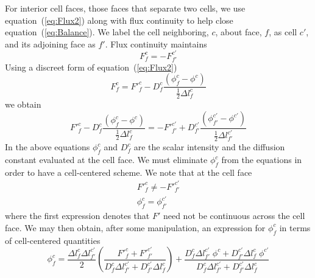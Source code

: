 \documentclass{article}
\begin{document}
For interior cell faces, those faces that separate two cells, we use
equation~(\ref{eq:Flux2}) along with flux continuity to help close
equation~(\ref{eq:Balance}).
We label the cell neighboring, $c$, about face, $f$, as cell $c'$, and its
adjoining face as $f'$.
Flux continuity maintains
\begin{equation}
        F^{c}_{f} = - F^{c'}_{f'}
\end{equation}
Using a discreet form of equation~(\ref{eq:Flux2})
\begin{equation}
        F^{c}_{f} = 
        {F'}^{c}_{f} - D^{c}_{f} \frac{(\phi^{c}_{f} - \phi^{c})}
                                      {\frac{1}{2}\Delta l^{c}_{f}}
\label{eq:Flux3}
\end{equation}
we obtain
\begin{equation}
        {F'}^{c}_{f} - D^{c}_{f} \frac{(\phi^{c}_{f} - \phi^{c})}
                                    {\frac{1}{2}\Delta l^{c}_{f}}
    = - {F'}^{c'}_{f'} + D^{c'}_{f'} \frac{(\phi^{c'}_{f'} - \phi^{c'})}
                                        {\frac{1}{2}\Delta l^{c'}_{f'}}
\end{equation}
In the above equations $\phi^{c}_{f}$ and $D^{c}_{f}$
are the scalar intensity and the diffusion constant evaluated
at the cell face.
We must eliminate $\phi^{c}_{f}$ from the equations in order to have a
cell-centered scheme.
We note that at the cell face
\begin{gather}
        {F'}^{c}_{f} \ne - {F'}^{c'}_{f'} \\
        \phi^{c}_{f} = \phi^{c'}_{f'}
\end{gather}
where the first expression denotes that $F'$ need not be continuous across
the cell face.
We may then obtain, after some manipulation,
an expression for $\phi^{c}_{f}$ in terms of cell-centered
quantities
\begin{equation}
        \phi^{c}_{f} =  \frac{\Delta l^{c}_{f} \Delta l^{c'}_{f'}}{2}
                        \left(
                        \frac
                        {  {F'}^{c}_{f} + {F'}^{c'}_{f'}
                        }
                        { D^{c}_{f} \Delta l^{c'}_{f'}
                            + D^{c'}_{f'} \Delta l^{c}_{f}
                        }
                        \right)
                        +
                        \frac
                        { D^{c}_{f} \Delta l^{c'}_{f'} \; \phi^{c} 
                            + D^{c'}_{f'} \Delta l^{c}_{f} \; \phi^{c'} 
                        }
                        { D^{c}_{f} \Delta l^{c'}_{f'}
                            + D^{c'}_{f'} \Delta l^{c}_{f}
                        }
\label{eq:phicf}
\end{equation}
\end{document}

